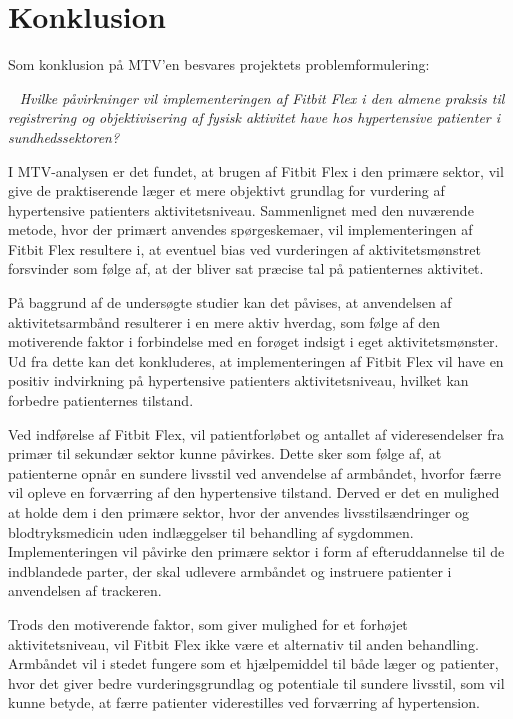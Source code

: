 \chapter{Konklusion}

Som konklusion på MTV'en besvares projektets problemformulering:

~
\textit{Hvilke påvirkninger vil implementeringen af Fitbit Flex i den almene praksis til registrering og objektivisering af fysisk aktivitet have hos hypertensive patienter i sundhedssektoren?}
~

\noindent I MTV-analysen er det fundet, at brugen af Fitbit Flex i den primære sektor, vil give de praktiserende læger et mere objektivt grundlag for vurdering af hypertensive patienters aktivitetsniveau. Sammenlignet med den nuværende metode, hvor der primært anvendes spørgeskemaer, vil implementeringen af Fitbit Flex resultere i, at eventuel bias ved vurderingen af aktivitetsmønstret forsvinder som følge af, at der bliver sat præcise tal på patienternes aktivitet.

På baggrund af de undersøgte studier kan det påvises, at anvendelsen af aktivitetsarmbånd resulterer i en mere aktiv hverdag, som følge af den motiverende faktor i forbindelse med en forøget indsigt i eget aktivitetsmønster. Ud fra dette kan det konkluderes, at implementeringen af Fitbit Flex vil have en positiv indvirkning på hypertensive patienters aktivitetsniveau, hvilket kan forbedre patienternes tilstand.

Ved indførelse af Fitbit Flex, vil patientforløbet og antallet af videresendelser fra primær til sekundær sektor kunne påvirkes. Dette sker som følge af, at patienterne opnår en sundere livsstil ved anvendelse af armbåndet, hvorfor færre vil opleve en forværring af den hypertensive tilstand. Derved er det en mulighed at holde dem i den primære sektor, hvor der anvendes livsstilsændringer og blodtryksmedicin uden indlæggelser til behandling af sygdommen. Implementeringen vil påvirke den primære sektor i form af efteruddannelse til de indblandede parter, der skal udlevere armbåndet og instruere patienter i anvendelsen af trackeren.

Trods den motiverende faktor, som giver mulighed for et forhøjet aktivitetsniveau, vil Fitbit Flex ikke være et alternativ til anden behandling. Armbåndet vil i stedet fungere som et hjælpemiddel til både læger og patienter, hvor det giver bedre vurderingsgrundlag og potentiale til sundere livsstil, som vil kunne betyde, at færre patienter viderestilles ved forværring af hypertension.